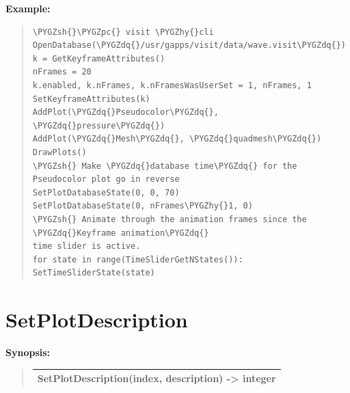 \documentclass[letterpaper,10pt,english]{sphinxmanual}
\def\PYGZsh{\char`\#}
\def\PYGZpc{\char`\%}
\def\PYGZhy{\char`\-}
\def\PYGZdq{\char`\"}
\begin{document}
\begin{DUlineblock}{0em}
\item[] 
\end{DUlineblock}

\begin{DUlineblock}{0em}
\item[] \textbf{Example:}
\item[] 
\end{DUlineblock}
\begin{quote}

\begin{Verbatim}[commandchars=\\\{\}]
\PYGZsh{}\PYGZpc{} visit \PYGZhy{}cli
OpenDatabase(\PYGZdq{}/usr/gapps/visit/data/wave.visit\PYGZdq{})
k = GetKeyframeAttributes()
nFrames = 20
k.enabled, k.nFrames, k.nFramesWasUserSet = 1, nFrames, 1
SetKeyframeAttributes(k)
AddPlot(\PYGZdq{}Pseudocolor\PYGZdq{}, \PYGZdq{}pressure\PYGZdq{})
AddPlot(\PYGZdq{}Mesh\PYGZdq{}, \PYGZdq{}quadmesh\PYGZdq{})
DrawPlots()
\PYGZsh{} Make \PYGZdq{}database time\PYGZdq{} for the Pseudocolor plot go in reverse
SetPlotDatabaseState(0, 0, 70)
SetPlotDatabaseState(0, nFrames\PYGZhy{}1, 0)
\PYGZsh{} Animate through the animation frames since the \PYGZdq{}Keyframe animation\PYGZdq{}
time slider is active.
for state in range(TimeSliderGetNStates()):
SetTimeSliderState(state)
\end{Verbatim}
\end{quote}


\section{SetPlotDescription}
\label{functions:setplotdescription}
\begin{DUlineblock}{0em}
\item[] \textbf{Synopsis:}
\end{DUlineblock}
\begin{quote}

\begin{tabulary}{\linewidth}{|L|}
\hline

SetPlotDescription(index, description) -\textgreater{} integer
\\
\hline\end{tabulary}

\end{quote}
\end{document}
